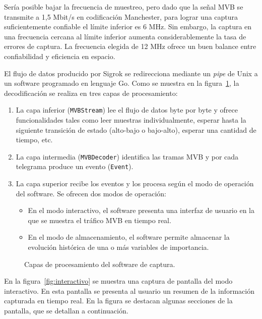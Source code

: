 Sería posible bajar la frecuencia de muestreo, pero dado que la señal MVB se transmite a 1,5 Mbit/s en codificación Manchester, para lograr una captura suficientemente confiable el límite inferior es 6 MHz.
Sin embargo, la captura en una frecuencia cercana al límite inferior aumenta considerablemente la tasa de errores de captura.
La frecuencia elegida de 12 MHz ofrece un buen balance entre confiabilidad y eficiencia en espacio.

El flujo de datos producido por Sigrok se redirecciona mediante un \textit{pipe} de Unix a un software programado en lenguaje Go. Como se muestra en la figura~\ref{fig:capas-software}, la decodificación se realiza en tres capas de procesamiento:

\begin{enumerate}
\item La capa inferior (\texttt{MVBStream}) lee el flujo de datos byte por byte y ofrece funcionalidades tales como leer muestras individualmente, esperar hasta la siguiente transición de estado (alto-bajo o bajo-alto), esperar una cantidad de tiempo, etc.
\item La capa intermedia (\texttt{MVBDecoder}) identifica las tramas MVB y por cada telegrama produce un evento (\texttt{Event}).
\item La capa superior recibe los eventos y los procesa según el modo de operación del software. Se ofrecen dos modos de operación:
    \begin{itemize}
        \item En el modo interactivo, el software presenta una interfaz de usuario en la que se muestra el tráfico MVB en tiempo real.
        \item En el modo de almacenamiento, el software permite almacenar la evolución histórica de una o más variables de importancia.
    \end{itemize}
\end{enumerate}

\begin{figure}[htbp]
	\centering
    {
        \fontsize{9pt}{9pt}\selectfont
        
    }
	\caption{Capas de procesamiento del software de captura.}
    \label{fig:capas-software}
\end{figure}

En la figura~\ref{fig:interactivo} se muestra una captura de pantalla del modo interactivo.
En esta pantalla se presenta al usuario un resumen de la información capturada en tiempo real.
En la figura se destacan algunas secciones de la pantalla, que se detallan a continuación.


